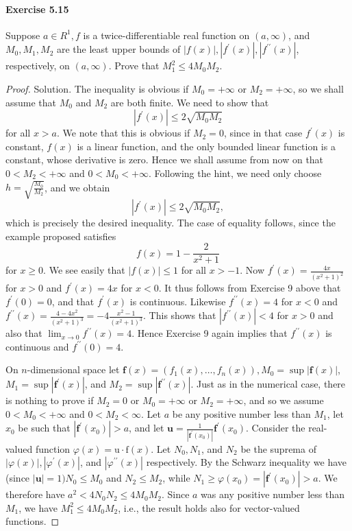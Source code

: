 \documentclass{article}
\theoremstyle{definition}
\begin{document}
\paragraph{Exercise 5.15} Suppose $a \in R^{1}, f$ is a twice-differentiable real function on $(a, \infty)$, and $M_{0}, M_{1}, M_{2}$ are the least upper bounds of $|f(x)|,\left|f^{\prime}(x)\right|,\left|f^{\prime \prime}(x)\right|$, respectively, on $(a, \infty)$. Prove that $M_{1}^{2} \leq 4 M_{0} M_{2} .$
\begin{proof}
    Solution. The inequality is obvious if $M_0=+\infty$ or $M_2=+\infty$, so we shall assume that $M_0$ and $M_2$ are both finite. We need to show that
$$
\left|f^{\prime}(x)\right| \leq 2 \sqrt{M_0 M_2}
$$
for all $x>a$. We note that this is obvious if $M_2=0$, since in that case $f^{\prime}(x)$ is constant, $f(x)$ is a linear function, and the only bounded linear function is a constant, whose derivative is zero. Hence we shall assume from now on that $0<M_2<+\infty$ and $0<M_0<+\infty$.
Following the hint, we need only choose $h=\sqrt{\frac{M_0}{M_2}}$, and we obtain
$$
\left|f^{\prime}(x)\right| \leq 2 \sqrt{M_0 M_2},
$$
which is precisely the desired inequality.
The case of equality follows, since the example proposed satisfies
$$
f(x)=1-\frac{2}{x^2+1}
$$
for $x \geq 0$. We see easily that $|f(x)| \leq 1$ for all $x>-1$. Now $f^{\prime}(x)=\frac{4 x}{\left(x^2+1\right)^2}$ for $x>0$ and $f^{\prime}(x)=4 x$ for $x<0$. It thus follows from Exercise 9 above that $f^{\prime}(0)=0$, and that $f^{\prime}(x)$ is continuous. Likewise $f^{\prime \prime}(x)=4$ for $x<0$ and $f^{\prime \prime}(x)=\frac{4-4 x^2}{\left(x^2+1\right)^3}=-4 \frac{x^2-1}{\left(x^2+1\right)^3}$. This shows that $\left|f^{\prime \prime}(x)\right|<4$ for $x>0$ and also that $\lim _{x \rightarrow 0} f^{\prime \prime}(x)=4$. Hence Exercise 9 again implies that $f^{\prime \prime}(x)$ is continuous and $f^{\prime \prime}(0)=4$.

On $n$-dimensional space let $\mathbf{f}(x)=\left(f_1(x), \ldots, f_n(x)\right), M_0=\sup |\mathbf{f}(x)|$, $M_1=\sup \left|\mathbf{f}^{\prime}(x)\right|$, and $M_2=\sup \left|\mathbf{f}^{\prime \prime}(x)\right|$. Just as in the numerical case, there is nothing to prove if $M_2=0$ or $M_0=+\infty$ or $M_2=+\infty$, and so we assume $0<M_0<+\infty$ and $0<M_2<\infty$. Let $a$ be any positive number less than $M_1$, let $x_0$ be such that $\left|\mathbf{f}^{\prime}\left(x_0\right)\right|>a$, and let $\mathbf{u}=\frac{1}{\left|\mathbf{f}^{\prime}\left(x_0\right)\right|} \mathbf{f}^{\prime}\left(x_0\right)$. Consider the real-valued function $\varphi(x)=\mathrm{u} \cdot \mathrm{f}(x)$. Let $N_0, N_1$, and $N_2$ be the suprema of $|\varphi(x)|,\left|\varphi^{\prime}(x)\right|$, and $\left|\varphi^{\prime \prime}(x)\right|$ respectively. By the Schwarz inequality we have (since $|\mathbf{u}|=1) N_0 \leq M_0$ and $N_2 \leq M_2$, while $N_1 \geq \varphi\left(x_0\right)=\left|\mathbf{f}^{\prime}\left(x_0\right)\right|>a$. We therefore have $a^2<4 N_0 N_2 \leq 4 M_0 M_2$. Since $a$ was any positive number less than $M_1$, we have $M_1^2 \leq 4 M_0 M_2$, i.e., the result holds also for vector-valued functions.


\end{proof}
\end{document}
